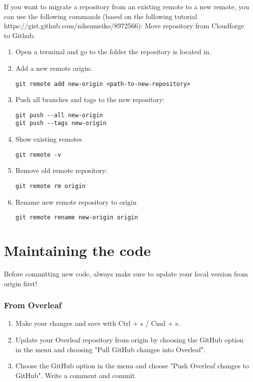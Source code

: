 \documentclass{article}
\begin{document}
If you want to migrate a repository from an existing remote to a new remote, you can use the following commands (based on the following tutorial https://gist.github.com/niksumeiko/8972566):
Move repository from Cloudforge to Github.
\begin{enumerate}
    \item Open a terminal and go to the folder the repository is located in.
    \item Add a new remote origin:
    \begin{verbatim}
git remote add new-origin <path-to-new-repository>
    \end{verbatim}
    \item Push all branches and tags to the new repository:
    \begin{verbatim}
git push --all new-origin
git push --tags new-origin
    \end{verbatim}
    \item Show existing remotes
    \begin{verbatim}
git remote -v
    \end{verbatim}
    \item Remove old remote repository:
    \begin{verbatim}
git remote rm origin
    \end{verbatim} 
    \item Rename new remote repository to origin
    \begin{verbatim}
git remote rename new-origin origin
    \end{verbatim}
\end{enumerate}

\section{Maintaining the code}

Before committing new code, always make sure to update your local version from origin first!

\subsubsection{From Overleaf}

\begin{enumerate}
    \item Make your changes and save with Ctrl + s / Cmd + s.
    \item Update your Overleaf repository from origin by choosing the GitHub option in the menu and choosing "Pull GitHub changes into Overleaf".
    \item Choose the GitHub option in the menu and choose "Push Overleaf changes to GitHub". Write a comment and commit.
\end{enumerate}
\end{document}

